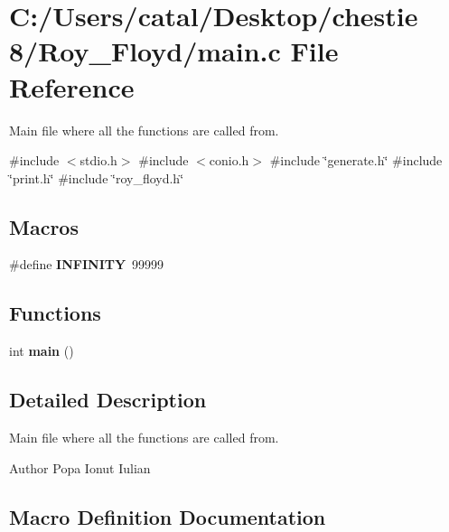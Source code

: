 \section{C\+:/\+Users/catal/\+Desktop/chestie 8/\+Roy\+\_\+\+Floyd/main.c File Reference}
\label{main_8c}


Main file where all the functions are called from.  


{\ttfamily \#include $<$stdio.\+h$>$}\newline
{\ttfamily \#include $<$conio.\+h$>$}\newline
{\ttfamily \#include \char`\"{}generate.\+h\char`\"{}}\newline
{\ttfamily \#include \char`\"{}print.\+h\char`\"{}}\newline
{\ttfamily \#include \char`\"{}roy\+\_\+floyd.\+h\char`\"{}}\newline
\subsection*{Macros}
\begin{DoxyCompactItemize}
\item 
\#define \textbf{ I\+N\+F\+I\+N\+I\+TY}~99999
\end{DoxyCompactItemize}
\subsection*{Functions}
\begin{DoxyCompactItemize}
\item 
int \textbf{ main} ()
\end{DoxyCompactItemize}


\subsection{Detailed Description}
Main file where all the functions are called from. 

\begin{DoxyAuthor}{Author}
Popa Ionut Iulian 
\end{DoxyAuthor}


\subsection{Macro Definition Documentation}
\mbox{\label{main_8c_a956e2723d559858d08644ac99146e910}} 
